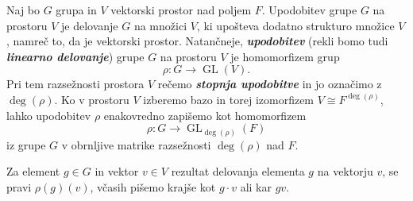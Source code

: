 \documentclass[11pt]{book}
\DeclareMathOperator\GL{GL}
\def\definicija{\color{rdeca}\bf\em}
\theoremstyle{definition}
\theoremstyle{zgled}
\theoremstyle{odprtproblem}
\theoremstyle{domacanaloga}
\theoremstyle{izrek}
\begin{document}
Naj bo $G$ grupa in $V$ vektorski prostor nad poljem $F$. Upodobitev grupe $G$ na prostoru $V$ je delovanje $G$ na množici $V$, ki upošteva dodatno strukturo množice $V$, namreč to, da je vektorski prostor. Natančneje, {\definicija upodobitev} (rekli bomo tudi {\definicija linearno delovanje}) grupe $G$ na prostoru $V$ je homomorfizem grup
\[
    \rho \colon G \to \GL(V).
\]
Pri tem razsežnosti prostora $V$ rečemo {\definicija stopnja upodobitve} in jo označimo z $\deg(\rho)$. Ko v prostoru $V$ izberemo bazo in torej izomorfizem $V \cong F^{\deg(\rho)}$, lahko upodobitev $\rho$ enakovredno zapišemo kot homomorfizem
\[
    \rho \colon G \to \textstyle \GL_{\deg(\rho)}(F)
\]
iz grupe $G$ v obrnljive matrike razsežnosti $\deg(\rho)$ nad $F$.

Za element $g \in G$ in vektor $v \in V$ rezultat delovanja elementa $g$ na vektorju $v$, se pravi $\rho(g)(v)$, včasih pišemo krajše kot $g \cdot v$ ali kar $gv$.
\end{document}
